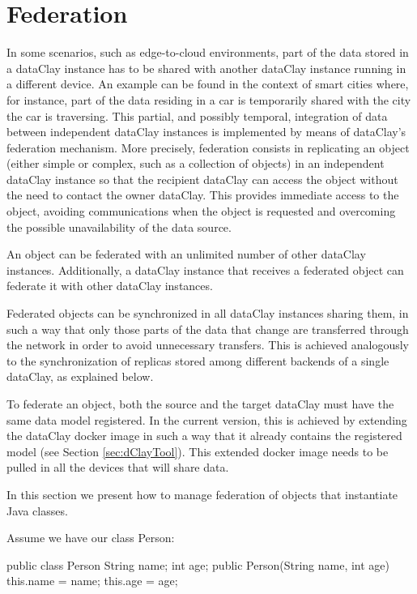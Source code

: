 \section{Federation}
\label{sec:jFederation}

In some scenarios, such as edge-to-cloud environments, part of the data stored in a dataClay instance has to be shared with another dataClay instance running in a different device. An example can be found in the context of smart cities where, for instance, part of the data residing in a car is temporarily shared with the city the car is traversing. This partial, and possibly temporal, integration of data between independent dataClay instances is implemented by means of dataClay's federation mechanism.
More precisely, federation consists in replicating an object (either simple or complex, such as a collection of objects) in an independent dataClay instance so that the recipient dataClay can access the object without the need to contact the owner dataClay. This provides immediate access to the object, avoiding communications when the object is requested and overcoming the possible unavailability of the data source. 

An object can be federated with an unlimited number of other dataClay instances. Additionally, a dataClay instance that receives a federated object can federate it with other dataClay instances.

Federated objects can be synchronized in all dataClay instances sharing them, in such a way that only those parts of the data that change are transferred through the network in order to avoid unnecessary transfers. This is achieved analogously to the synchronization of replicas stored among different backends of a single dataClay, as explained below. 

To federate an object, both the source and the target dataClay must have the same data model registered. In the current version, this is achieved by extending the dataClay docker image in such a way that it already contains the registered model (see Section \ref{sec:dClayTool}). This extended docker image needs to be pulled in all the devices that will share data.

In this section we present how to manage federation of objects that instantiate Java classes. 

Assume we have our class Person:

\begin{tBox}
\begin{java}
public class Person {
  String name;
  int age;
  public Person(String name, int age) {
    this.name = name;
    this.age = age;
  }
}
\end{java}
\end{tBox}

